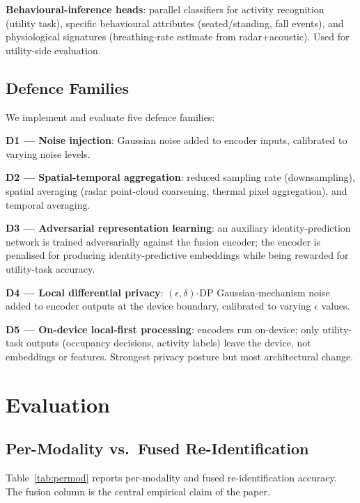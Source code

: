 \documentclass[sigconf,nonacm]{acmart}
\begin{document}
\textbf{Behavioural-inference heads}: parallel classifiers for
activity recognition (utility task), specific behavioural attributes
(seated/standing, fall events), and physiological signatures
(breathing-rate estimate from radar+acoustic). Used for
utility-side evaluation.

\subsection{Defence Families}

We implement and evaluate five defence families:

\textbf{D1 --- Noise injection}: Gaussian noise added to encoder
inputs, calibrated to varying noise levels.

\textbf{D2 --- Spatial-temporal aggregation}: reduced sampling rate
(downsampling), spatial averaging (radar point-cloud coarsening,
thermal pixel aggregation), and temporal averaging.

\textbf{D3 --- Adversarial representation learning}: an auxiliary
identity-prediction network is trained adversarially against the
fusion encoder; the encoder is penalised for producing
identity-predictive embeddings while being rewarded for
utility-task accuracy.

\textbf{D4 --- Local differential privacy}: $(\epsilon, \delta)$-DP
Gaussian-mechanism noise added to encoder outputs at the device
boundary, calibrated to varying $\epsilon$ values.

\textbf{D5 --- On-device local-first processing}: encoders run
on-device; only utility-task outputs (occupancy decisions, activity
labels) leave the device, not embeddings or features. Strongest
privacy posture but most architectural change.

\section{Evaluation}

\subsection{Per-Modality vs.\ Fused Re-Identification}

Table~\ref{tab:permod} reports per-modality and fused
re-identification accuracy. The fusion column is the central
empirical claim of the paper.
\end{document}
